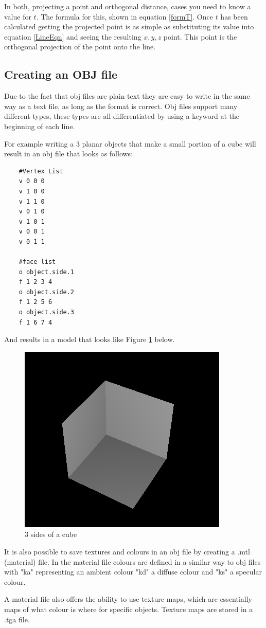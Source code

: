	In both, projecting a point and orthogonal distance, cases you need to know a value for $t$. The formula for this, shown in equation \ref{formT}. Once $t$ has been calculated getting the projected point is as simple as substituting its value into equation \ref{LineEqn} and seeing the resulting $x,y,z$ point. This point is the orthogonal projection of the point onto the line.
	
	\subsection{Creating an OBJ file}
	\label{makeOBJfile}
	Due to the fact that obj files are plain text they are easy to write in the same way as a text file, as long as the format is correct. Obj files support many different types, these types are all differentiated by using a keyword at the beginning of each line. 
	
	For example writing a 3 planar objects that make a small portion of a cube will result in an obj file that looks as follows:
	\newpage
	\begin{lstlisting}
	#Vertex List
	v 0 0 0
	v 1 0 0
	v 1 1 0
	v 0 1 0
	v 1 0 1
	v 0 0 1
	v 0 1 1

	#face list
	o object.side.1
	f 1 2 3 4
	o object.side.2
	f 1 2 5 6
	o object.side.3
	f 1 6 7 4
	\end{lstlisting}
	And results in a model that looks like Figure \ref{fig:half-box} below.
	
	
	\begin{figure}[H]
		\centering
		\includegraphics[width=0.5\linewidth]{Includes/images/half-box}
		\caption{3 sides of a cube}
		\label{fig:half-box}
	\end{figure}
	
	It is also possible to save textures and colours in an obj file by creating a .mtl (material) file. In the material file colours are defined in a similar way to obj files with "ka" representing an ambient colour "kd" a diffuse colour and "ks" a specular colour. 
	
	A material file also offers the ability to use texture maps, which are essentially maps of what colour is where for specific objects. Texture maps are stored in a .tga file.
	
	
		

	


